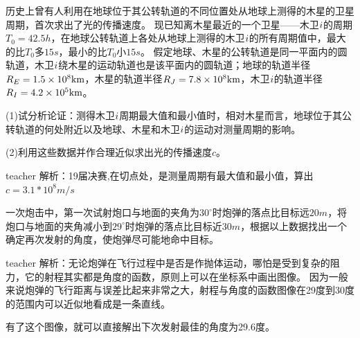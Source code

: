 \begin{example}
历史上曾有人利用在地球位于其公转轨道的不同位置处从地球上测得的木星的卫星周期，首次求出了光的传播速度。
现已知离木星最近的一个卫星——木卫$\uppercase\expandafter{\romannumeral1}$的周期$T_0=42.5\unit{h}$，在地球公转轨道上各处从地球上测得的木卫$\uppercase\expandafter{\romannumeral1}$的所有周期值中，最大的比$T_0$多$15\unit{s}$，最小的比$T_0$小$15\unit{s}$。
假定地球、木星的公转轨道是同一平面内的圆轨道，木卫$\uppercase\expandafter{\romannumeral1}$绕木星的运动轨道也是该平面内的圆轨道；地球的轨道半径$R_E = 1.5\times 10^{8}{\rm{km}}$，木星的轨道半径$R_J = 7.8\times 10^{8}{\rm{km}}$，木卫$\uppercase\expandafter{\romannumeral1}$的轨道半径$R_I = 4.2\times 10^{5}{\rm{km}}$。

(1)试分析论证：测得木卫$\uppercase\expandafter{\romannumeral1}$周期最大值和最小值时，相对木星而言，地球位于其公转轨道的何处附近以及地球、木星和木卫$\uppercase\expandafter{\romannumeral1}$的运动对测量周期的影响。

(2)利用这些数据并作合理近似求出光的传播速度$c$。
\begin{taggedblock}{teacher}
\newline
解析：19届决赛,在切点处，是测量周期有最大值和最小值，算出$c=3.1*10^8 m/s$
\end{taggedblock}
\end{example}







\begin{example}
一次炮击中，第一次试射炮口与地面的夹角为$30^\circ$时炮弹的落点比目标远$20\unit{m}$，将炮口与地面的夹角减小到$29^\circ$时炮弹的落点比目标近$30\unit{m}$，根据以上数据找出一个确定再次发射的角度，使炮弹尽可能地命中目标。
\begin{taggedblock}{teacher}
\newline
解析：无论炮弹在飞行过程中是否是作抛体运动，哪怕是受到复杂的阻力，它的射程其实都是角度的函数，原则上可以在坐标系中画出图像。
因为一般来说炮弹的飞行距离与误差比起来非常之大，射程与角度的函数图像在29度到30度的范围内可以近似地看成是一条直线。

有了这个图像，就可以直接解出下次发射最佳的角度为29.6度。
\end{taggedblock}
\end{example}



